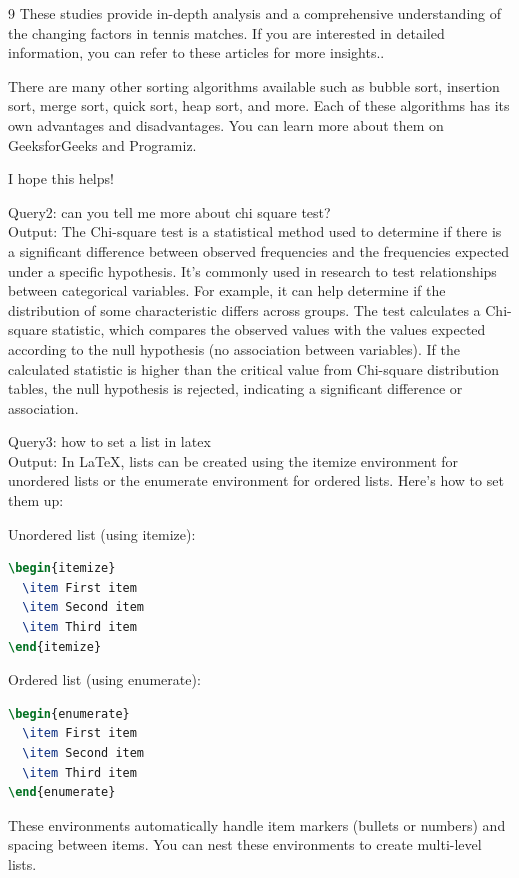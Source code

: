 \documentclass{mcmthesis}
\begin{document}
\begin{ReportAiUse}{9}
These studies provide in-depth analysis and a comprehensive understanding of the changing factors in tennis matches. If you are interested in detailed information, you can refer to these articles for more insights..

There are many other sorting algorithms available such as bubble sort, insertion sort, merge sort, quick sort, heap sort, and more. Each of these algorithms has its own advantages and disadvantages. You can learn more about them on GeeksforGeeks and Programiz.

I hope this helps!

Query2: can you tell me more about chi square test?\\
Output: The Chi-square test is a statistical method used to determine if there is a significant difference between observed frequencies and the frequencies expected under a specific hypothesis. It's commonly used in research to test relationships between categorical variables. For example, it can help determine if the distribution of some characteristic differs across groups. The test calculates a Chi-square statistic, which compares the observed values with the values expected according to the null hypothesis (no association between variables). If the calculated statistic is higher than the critical value from Chi-square distribution tables, the null hypothesis is rejected, indicating a significant difference or association.


Query3: how to set a list in latex\\
Output: In LaTeX, lists can be created using the itemize environment for unordered lists or the enumerate environment for ordered lists. Here's how to set them up:

Unordered list (using itemize):
\begin{lstlisting}[language=tex]
\begin{itemize}
  \item First item
  \item Second item
  \item Third item
\end{itemize}
\end{lstlisting}
Ordered list (using enumerate):
\begin{lstlisting}[language=tex]
\begin{enumerate}
  \item First item
  \item Second item
  \item Third item
\end{enumerate}
\end{lstlisting}
These environments automatically handle item markers (bullets or numbers) and spacing between items. You can nest these environments to create multi-level lists.

\end{ReportAiUse}
\end{document}
